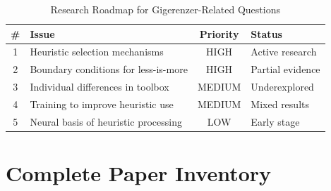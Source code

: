 \begin{table}[htbp]
\centering
\caption{Research Roadmap for Gigerenzer-Related Questions}
\label{tab:gi-roadmap}
\renewcommand{\arraystretch}{1.3}
\begin{tabular}{@{}clcl@{}}
\toprule
\textbf{\#} & \textbf{Issue} & \textbf{Priority} & \textbf{Status} \\
\midrule
1 & Heuristic selection mechanisms & HIGH & Active research \\
2 & Boundary conditions for less-is-more & HIGH & Partial evidence \\
3 & Individual differences in toolbox & MEDIUM & Underexplored \\
4 & Training to improve heuristic use & MEDIUM & Mixed results \\
5 & Neural basis of heuristic processing & LOW & Early stage \\
\bottomrule
\end{tabular}
\end{table}


\section{Complete Paper Inventory}
\label{sec:gi-papers}

